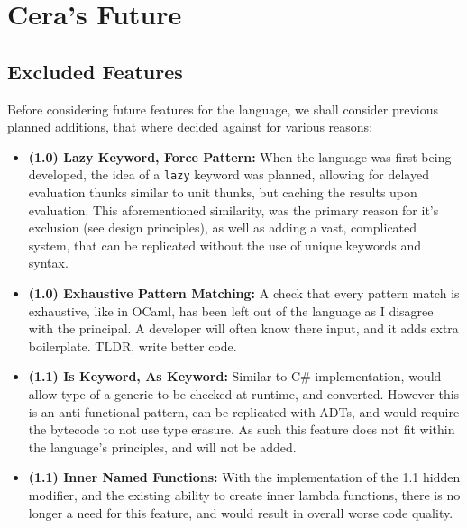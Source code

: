 \documentclass[11pt, a4paper]{article}
\begin{document}
\section{Cera's Future}

\subsection{Excluded Features}

Before considering future features for the language, we shall consider previous planned additions, that where decided against for various reasons:
\begin{itemize}
    \item \textbf{(1.0) Lazy Keyword, Force Pattern:} When the language was first being developed, the idea of a \texttt{lazy} keyword was planned, allowing for delayed evaluation thunks similar to unit thunks, but caching the results upon evaluation. This aforementioned similarity, was the primary reason for it's exclusion (see design principles), as well as adding a vast, complicated system, that can be replicated without the use of unique keywords and syntax.
    \item \textbf{(1.0) Exhaustive Pattern Matching:} A check that every pattern match is exhaustive, like in OCaml, has been left out of the language as I disagree with the principal. A developer will often know there input, and it adds extra boilerplate. TLDR, write better code.
    \item \textbf{(1.1) Is Keyword, As Keyword:} Similar to C\# implementation, would allow type of a generic to be checked at runtime, and converted. However this is an anti-functional pattern, can be replicated with ADTs, and would require the bytecode to not use type erasure. As such this feature does not fit within the language's principles, and will not be added.
    \item \textbf{(1.1) Inner Named Functions:} With the implementation of the 1.1 hidden modifier, and the existing ability to create inner lambda functions, there is no longer a need for this feature, and would result in overall worse code quality.
\end{itemize}

\end{document}
